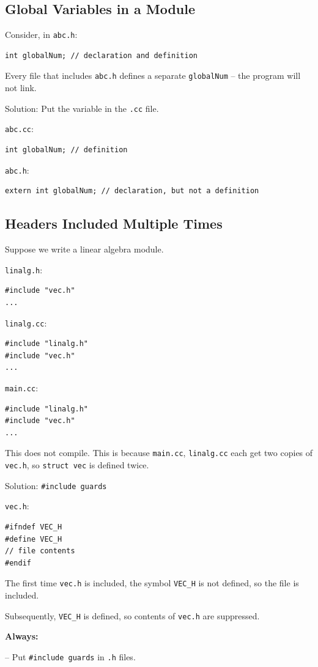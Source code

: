 \documentclass[11pt]{article}
\theoremstyle{definition}
\begin{document}
\subsection{Global Variables in a Module}
Consider, in {\tt abc.h}:
\begin{lstlisting}
int globalNum; // declaration and definition
\end{lstlisting}
Every file that includes {\tt abc.h} defines a separate {\tt globalNum} -- the program will not link.

Solution: Put the variable in the {\tt .cc} file.

{\tt abc.cc}:
\begin{lstlisting}
int globalNum; // definition
\end{lstlisting}
{\tt abc.h}:
\begin{lstlisting}
extern int globalNum; // declaration, but not a definition
\end{lstlisting}

\subsection{Headers Included Multiple Times}
Suppose we write a linear algebra module.

{\tt linalg.h}:
\begin{lstlisting}
#include "vec.h"
...
\end{lstlisting}
{\tt linalg.cc}:
\begin{lstlisting}
#include "linalg.h"
#include "vec.h"
...
\end{lstlisting}
{\tt main.cc}:
\begin{lstlisting}
#include "linalg.h"
#include "vec.h"
...
\end{lstlisting}
This does not compile. This is because {\tt main.cc}, {\tt linalg.cc} each get two copies of {\tt vec.h}, so {\tt struct vec} is defined twice.

Solution: {\tt \#include guards}

{\tt vec.h}:
\begin{lstlisting}
#ifndef VEC_H
#define VEC_H
// file contents
#endif
\end{lstlisting}
The first time {\tt vec.h} is included, the symbol {\tt VEC\_H} is not defined, so the file is included.

Subsequently, {\tt VEC\_H} is defined, so contents of {\tt vec.h} are suppressed.

{\bf Always:} 

-- Put {\tt \#include guards} in {\tt .h} files.
\end{document}
